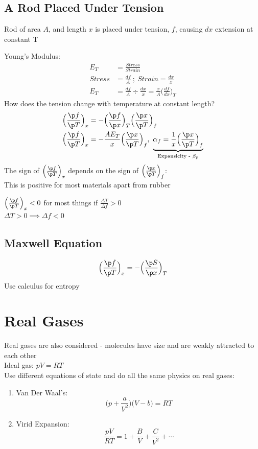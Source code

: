 \documentclass[a4paper, 11pt, normalem]{report}
\begin{document}
\subsection{A Rod Placed Under Tension}
Rod of area $A$, and length $x$ is placed under tension, $f$, causing $dx$ extension at constant T

Young's Modulus:
\begin{align*}
    E_T &= \frac{Stress}{Strain} \\
    Stress &= \frac{df}{A} ~;~ Strain = \frac{dx}{x} \\
    E_T &= \frac{df}{A} \div \frac{dx}{x} = \frac{x}{A} \Big(\frac{df}{dx}\Big)_T
\end{align*}
How does the tension change with temperature at constant length?
\begin{align*}
    \Big(\frac{\p f}{\p T}\Big)_x &= -\Big(\frac{\p f}{\p x}\Big)_T \Big(\frac{\p x}{\p T}\Big)_f \\
    \Big(\frac{\p f}{\p T}\Big)_x &= -\frac{AE_T}{x}\Big(\frac{\p x}{\p T}\Big)_f,~ \underbrace{\alpha_f = \frac{1}{x}\Big(\frac{\p x}{\p T}\Big)_f}_{\text{Expansicity - }\beta_p}
\end{align*}
The sign of $\Big(\frac{\p f}{\p T}\Big)_x$ depends on the sign of $\Big(\frac{\p x}{\p T}\Big)_f$: \\
This is positive for most materials apart from rubber

$\Big(\frac{\p f}{\p T}\Big)_x < 0$ for most things if $\frac{\Delta T}{\Delta f} > 0$ \\
$\Delta T > 0 \implies \Delta f < 0$

\subsection{Maxwell Equation}
\begin{equation*}
    \Big(\frac{\p f}{\p T}\Big)_x = -\Big(\frac{\p S}{\p x}\Big)_T
\end{equation*}
Use calculus for entropy

\section{Real Gases}
Real gases are also considered - molecules have size and are weakly attracted to each other \\
Ideal gas: $pV = RT$ \\
Use different equations of state and do all the same physics on real gases:
\begin{enumerate}
    \item Van Der Waal's:
            \begin{equation*}
                \Big(p + \frac{a}{V^2}\Big)\Big(V - b\Big) = RT
            \end{equation*}
    \item Virid Expansion:
            \begin{equation*}
                \frac{pV}{RT} = 1 + \frac{B}{V} + \frac{C}{V^2} + \cdots
            \end{equation*}
\end{enumerate}
\end{document}
